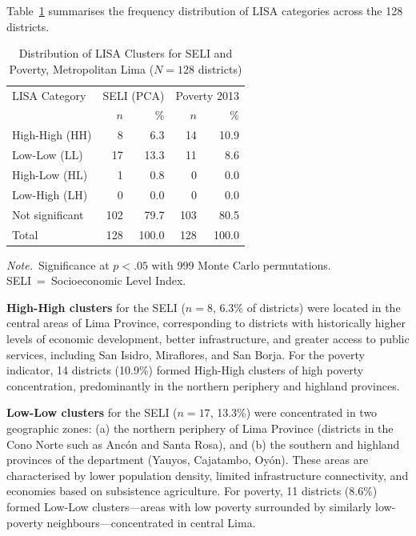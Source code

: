 \documentclass[12pt,a4paper,twoside]{article}
\begin{document}
Table~\ref{tab:lisa_freq} summarises the frequency distribution of LISA
categories across the 128 districts.

\begin{table}[htbp]
  \centering
  \footnotesize
  \caption{Distribution of LISA Clusters for SELI and Poverty, Metropolitan Lima
           ($N = 128$ districts)}
  \label{tab:lisa_freq}
  \begin{tabular}{lrrrr}
    \toprule
    LISA Category & \multicolumn{2}{c}{SELI (PCA)} & \multicolumn{2}{c}{Poverty 2013} \\
    & $n$ & \% & $n$ & \% \\
    \midrule
    High-High (HH)    & 8  & 6.3  & 14 & 10.9 \\
    Low-Low (LL)      & 17 & 13.3 & 11 & 8.6  \\
    High-Low (HL)     & 1  & 0.8  & 0  & 0.0  \\
    Low-High (LH)     & 0  & 0.0  & 0  & 0.0  \\
    Not significant   & 102 & 79.7 & 103 & 80.5 \\
    \midrule
    Total             & 128 & 100.0 & 128 & 100.0 \\
    \bottomrule
  \end{tabular}

  \vspace{4pt}
  \begin{minipage}{0.9\textwidth}
  \footnotesize\textit{Note.}\ Significance at $p < .05$ with 999 Monte Carlo
  permutations. SELI~=~Socioeconomic Level Index.
  \end{minipage}
\end{table}

\textbf{High-High clusters} for the SELI ($n = 8$, 6.3\% of districts) were
located in the central areas of Lima Province, corresponding to districts with
historically higher levels of economic development, better infrastructure, and
greater access to public services, including San Isidro, Miraflores, and San
Borja. For the poverty indicator, 14 districts (10.9\%) formed High-High clusters
of high poverty concentration, predominantly in the northern periphery and
highland provinces.

\textbf{Low-Low clusters} for the SELI ($n = 17$, 13.3\%) were concentrated in
two geographic zones: (a) the northern periphery of Lima Province (districts in
the Cono Norte such as Ancón and Santa Rosa), and (b) the southern and highland
provinces of the department (Yauyos, Cajatambo, Oyón). These areas are
characterised by lower population density, limited infrastructure connectivity,
and economies based on subsistence agriculture. For poverty, 11 districts (8.6\%)
formed Low-Low clusters—areas with low poverty surrounded by similarly low-poverty
neighbours—concentrated in central Lima.
\end{document}
